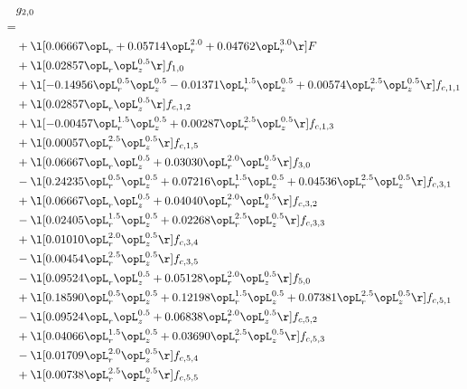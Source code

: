\begin{alignat}{2} 
\label{eq:g_20_0} 
& g_{2,0} \nonumber \\ 
 = \\ 
& + \l[  0.06667 \opL_r +  0.05714 \opL_r^{2.0} +  0.04762 \opL_r^{3.0}  \r] F \nonumber \\ 
& + \l[  0.02857 \opL_r \opL_z^{0.5}  \r] f_{1,0} \nonumber \\ 
& + \l[  -0.14956 \opL_r^{0.5} \opL_z^{0.5}   -0.01371 \opL_r^{1.5} \opL_z^{0.5} +  0.00574 \opL_r^{2.5} \opL_z^{0.5}  \r] f_{c,1,1} \nonumber \\ 
& + \l[  0.02857 \opL_r \opL_z^{0.5}  \r] f_{c,1,2} \nonumber \\ 
& + \l[  -0.00457 \opL_r^{1.5} \opL_z^{0.5} +  0.00287 \opL_r^{2.5} \opL_z^{0.5}  \r] f_{c,1,3} \nonumber \\ 
& + \l[  0.00057 \opL_r^{2.5} \opL_z^{0.5}  \r] f_{c,1,5} \nonumber \\ 
& + \l[  0.06667 \opL_r \opL_z^{0.5} +  0.03030 \opL_r^{2.0} \opL_z^{0.5}  \r] f_{3,0} \nonumber \\ 
& - \l[  0.24235 \opL_r^{0.5} \opL_z^{0.5} +  0.07216 \opL_r^{1.5} \opL_z^{0.5} +  0.04536 \opL_r^{2.5} \opL_z^{0.5}  \r] f_{c,3,1} \nonumber \\ 
& + \l[  0.06667 \opL_r \opL_z^{0.5} +  0.04040 \opL_r^{2.0} \opL_z^{0.5}  \r] f_{c,3,2} \nonumber \\ 
& - \l[  0.02405 \opL_r^{1.5} \opL_z^{0.5} +  0.02268 \opL_r^{2.5} \opL_z^{0.5}  \r] f_{c,3,3} \nonumber \\ 
& + \l[  0.01010 \opL_r^{2.0} \opL_z^{0.5}  \r] f_{c,3,4} \nonumber \\ 
& - \l[  0.00454 \opL_r^{2.5} \opL_z^{0.5}  \r] f_{c,3,5} \nonumber \\ 
& - \l[  0.09524 \opL_r \opL_z^{0.5} +  0.05128 \opL_r^{2.0} \opL_z^{0.5}  \r] f_{5,0} \nonumber \\ 
& + \l[  0.18590 \opL_r^{0.5} \opL_z^{0.5} +  0.12198 \opL_r^{1.5} \opL_z^{0.5} +  0.07381 \opL_r^{2.5} \opL_z^{0.5}  \r] f_{c,5,1} \nonumber \\ 
& - \l[  0.09524 \opL_r \opL_z^{0.5} +  0.06838 \opL_r^{2.0} \opL_z^{0.5}  \r] f_{c,5,2} \nonumber \\ 
& + \l[  0.04066 \opL_r^{1.5} \opL_z^{0.5} +  0.03690 \opL_r^{2.5} \opL_z^{0.5}  \r] f_{c,5,3} \nonumber \\ 
& - \l[  0.01709 \opL_r^{2.0} \opL_z^{0.5}  \r] f_{c,5,4} \nonumber \\ 
& + \l[  0.00738 \opL_r^{2.5} \opL_z^{0.5}  \r] f_{c,5,5} \nonumber \\ 
\end{alignat} 


